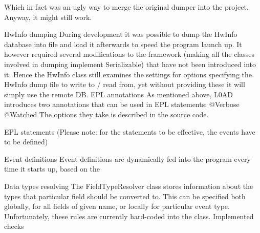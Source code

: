 Which in fact was an ugly way to merge the original dumper into the project. Anyway, it might still work.

HwInfo dumping
During development it was possible to dump the HwInfo database into file and load it afterwards to speed the program launch up. It however required several modifications to the framework (making all the classes involved in dumping implement Serializable) that have not been introduced into it. Hence the HwInfo class still examines the settings for options specifying the HwInfo dump file to write to / read from, yet without providing these it will simply use the remote DB.
EPL annotations
As mentioned above, L0AD introduces two annotations that can be used in EPL statements:
@Verbose
@Watched
The options they take is described in the source code.

EPL statements
(Please note: for the statements to be effective, the events have to be defined)

Event definitions
Event definitions are dynamically fed into the program every time it starts up, based on the 

Data types resolving
The FieldTypeResolver class stores information about the types that particular field should be converted to. This can be specified both globally, for all fields of given name, or locally for particular event type. Unfortunately, these rules are currently hard-coded into the class.
Implemented checks



